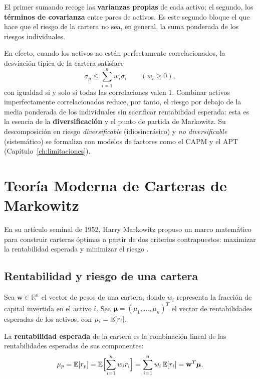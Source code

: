 El primer sumando recoge las \textbf{varianzas propias} de cada activo; el
segundo, los \textbf{términos de covarianza} entre pares de activos. Es este
segundo bloque el que hace que el riesgo de la cartera no sea, en general, la
suma ponderada de los riesgos individuales.

En efecto, cuando los activos no están perfectamente correlacionados, la
desviación típica de la cartera satisface
\begin{equation}
    \sigma_p \le \sum_{i=1}^{n} w_i \sigma_i \qquad (w_i \ge 0),
    \label{eq:subaditividad}
\end{equation}
con igualdad si y solo si todas las correlaciones valen $1$. Combinar activos
imperfectamente correlacionados reduce, por tanto, el riesgo por debajo de la
media ponderada de los individuales sin sacrificar rentabilidad esperada: esta
es la esencia de la \textbf{diversificación} y el punto de partida de Markowitz.
Su descomposición en riesgo \emph{diversificable} (idiosincrásico) y \emph{no
diversificable} (sistemático) se formaliza con modelos de factores como el CAPM
y el APT (Capítulo~\ref{ch:limitaciones}).

\section{Teoría Moderna de Carteras de Markowitz}

En su artículo seminal de 1952, Harry Markowitz propuso un marco
matemático para construir carteras óptimas a partir de dos criterios
contrapuestos: maximizar la rentabilidad esperada y minimizar el riesgo
\cite{Markowitz1952}.

\subsection{Rentabilidad y riesgo de una cartera}

Sea $\mathbf{w} \in \mathbb{R}^n$ el vector de pesos de una cartera,
donde $w_i$ representa la fracción de capital invertida en el activo $i$.
Sea $\boldsymbol{\mu} = (\mu_1, \dots, \mu_n)^T$ el vector de
rentabilidades esperadas de los activos, con $\mu_i = \mathbb{E}[r_i]$.

La \textbf{rentabilidad esperada} de la cartera es la combinación lineal
de las rentabilidades esperadas de sus componentes:
\begin{equation}
    \mu_p = \mathbb{E}[r_p] = \mathbb{E}\Bigl[\sum_{i=1}^{n} w_i r_i\Bigr]
    = \sum_{i=1}^{n} w_i \,\mathbb{E}[r_i]
    = \mathbf{w}^T \boldsymbol{\mu}.
    \label{eq:rentabilidad-cartera}
\end{equation}

